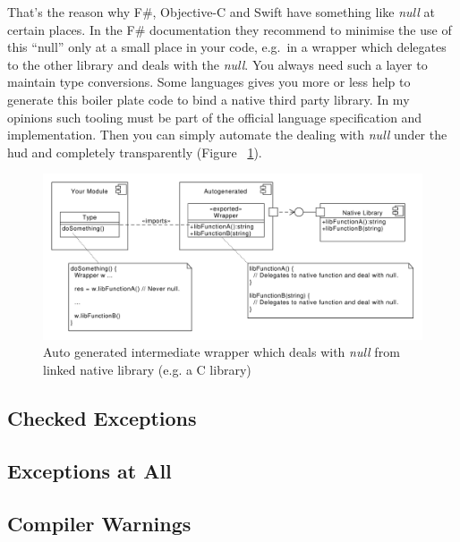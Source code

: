 \documentclass[12pt,a4paper]{report}
\begin{document}
That's the reason why F\#, Objective-C and Swift have something like \textit{null} at certain places. In the F\# documentation they recommend to minimise the use of this ``null'' only at a small place in your code, e.g.\ in a wrapper which delegates to the other library and deals with the \textit{null}. You always need such a layer to maintain type conversions. Some languages gives you more or less help to generate this boiler plate code to bind a native third party library. In my opinions such tooling must be part of the official language specification and implementation. Then you can simply automate the dealing with \textit{null} under the hud and completely transparently (Figure
 ~\ref{fig:Generated_wrapper_for_linked_native_libs}).

\begin{figure}[ht]
	\centering
    \includegraphics[width=350pt]{grafics/Generated_wrapper_for_linked_native_libs.pdf}
    \caption{Auto generated intermediate wrapper which deals with \textit{null} from linked native library (e.g. a C library)}
    \label{fig:Generated_wrapper_for_linked_native_libs}
\end{figure}

\subsection{Checked Exceptions}


\subsection{Exceptions at All}


\subsection{Compiler Warnings}
\end{document}
